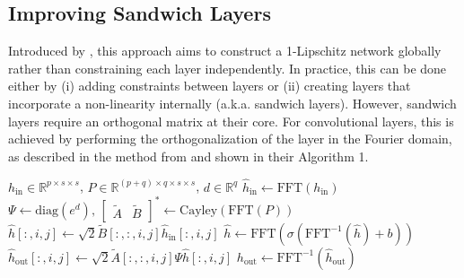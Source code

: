     \subsection{Improving Sandwich Layers}
    Introduced by \cite{wang_direct_2023}, this approach aims to construct a 1-Lipschitz network globally rather than constraining each layer independently. In practice, this can be done either by (i) adding constraints between layers or (ii) creating layers that incorporate a non-linearity internally (a.k.a. sandwich layers). However, sandwich layers require an orthogonal matrix at their core. For convolutional layers, this is achieved by performing the orthogonalization of the layer in the Fourier domain, as described in the method from \cite{trockman_orthogonalizing_2021} and shown in their Algorithm 1.
    \begin{algorithm}
        \caption{Sandwich convolutional layer (from \cite{wang_direct_2023})}
        \begin{algorithmic}[1]
            \Require $h_\text{in} \in \mathbb{R}^{p \times s \times s}$, $P \in \mathbb{R}^{(p+q) \times q \times s \times s}$, $d \in \mathbb{R}^q$
            \State $\hat{h}_\text{in} \gets \text{FFT}(h_\text{in})$
            \State $\Psi \gets \text{diag}(e^d), \, \begin{bmatrix} \tilde{A} & \tilde{B} \end{bmatrix}^* \gets \text{Cayley}(\text{FFT}(P))$
            \State $\hat{h}[:, i, j] \gets \sqrt{2} \tilde{B}[:, :, i, j] \hat{h}_\text{in}[:, i, j]$
            \State $\hat{h} \gets \text{FFT}(\sigma(\text{FFT}^{-1}(\hat{h}) + b))$
            \State $\hat{h}_\text{out}[:, i, j] \gets \sqrt{2} \tilde{A}[:, :, i, j] \Psi \hat{h}[:, i, j]$
            \State $h_\text{out} \gets \text{FFT}^{-1}(\hat{h}_\text{out})$
        \end{algorithmic}
    \end{algorithm}

